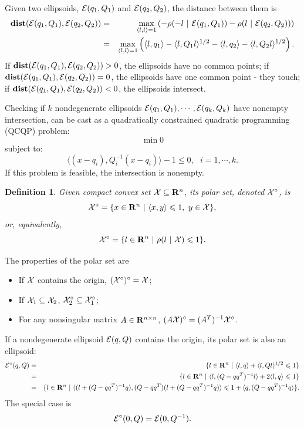 \documentclass{report}
\newtheorem{df}{Definition}[section]
\newcommand{\bd}{\begin{df}}
\newcommand{\ed}{\end{df}}
\newcommand{\EE}{{\cal E}}
\newcommand{\XX}{{\cal X}}
\begin{document}
Given two ellipsoids, $\EE(q_1,Q_1)$ and $\EE(q_2,Q_2)$, the distance between
them is
\begin{eqnarray}
{\bf dist}(\EE(q_1,Q_1),\EE(q_2,Q_2)) & = & \max_{\langle l,l\rangle=1}
\left(-\rho(-l ~|~ \EE(q_1,Q_1)) - \rho(l ~|~ \EE(q_2,Q_2))\right) \\
& = & \max_{\langle l,l\rangle=1}\left(\langle l,q_1\rangle -
\langle l,Q_1l\rangle^{1/2} - \langle l,q_2\rangle -
\langle l,Q_2l\rangle^{1/2}\right). \label{dist_ell}
\end{eqnarray}
If ${\bf dist}(\EE(q_1,Q_1),\EE(q_2,Q_2)) > 0$,  the ellipsoids have no
common points;
if ${\bf dist}(\EE(q_1,Q_1),\EE(q_2,Q_2)) = 0$,  the ellipsoids have one
common point - they touch;
if ${\bf dist}(\EE(q_1,Q_1),\EE(q_2,Q_2)) < 0$,  the ellipsoids intersect.

Checking if $k$ nondegenerate ellipsoids $\EE(q_1,Q_1),\cdots,\EE(q_k,Q_k)$
have nonempty intersection, can be cast as a quadratically constrained
quadratic programming (QCQP) problem:
\[ \min 0 \]
subject to:
\[ \langle (x-q_i),Q_i^{-1}(x-q_i)\rangle - 1 \leq 0, ~~~ i=1,\cdots,k. \]
If this problem is feasible,  the intersection is nonempty.
\bd
Given compact convex set $\XX\subseteq{\bf R}^n$, its polar set, denoted
$\XX^\circ$, is
\[ \XX^\circ = \{x\in{\bf R}^n ~|~ \langle x,y\rangle\leq 1, ~ y\in\XX\}, \]
or, equivalently,
\[ \XX^\circ = \{l\in{\bf R}^n ~|~ \rho(l ~|~ \XX)\leq 1\}. \]
\ed
The properties of the polar set are
\begin{itemize}
\item If  $\XX$ contains the origin,  $(\XX^\circ)^\circ = \XX$;
\item If $\XX_1\subseteq\XX_2$,  $\XX_2^\circ\subseteq\XX_1^\circ$;
\item For any nonsingular matrix $A\in{\bf R}^{n\times n}$,
$(A\XX)^\circ = (A^T)^{-1}\XX^\circ$.
\end{itemize}
If a nondegenerate ellipsoid $\EE(q,Q)$ contains the origin,
 its polar set is also an ellipsoid:
\begin{eqnarray*}
\EE^\circ(q,Q) & = & \{l\in{\bf R}^n ~|~ \langle l,q\rangle +
\langle l,Ql\rangle^{1/2}\leq1 \}\\
& = & \{l\in{\bf R}^n ~|~ \langle l,(Q-qq^T)^{-1}l\rangle +
2\langle l,q\rangle\leq1 \}\\
& = & \{l\in{\bf R}^n ~|~ \langle(l+(Q-qq^T)^{-1}q),
(Q-qq^T)(l+(Q-qq^T)^{-1}q)\rangle\leq1+\langle q,(Q-qq^T)^{-1}q\rangle \}.
\end{eqnarray*}
The special case is
\[ \EE^\circ(0,Q) = \EE(0,Q^{-1}). \]
\end{document}
